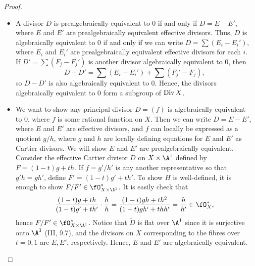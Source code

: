 \documentclass[a4paper]{article}
\begin{document}
\begin{enumerate} [label=\textbf{\arabic*.}, leftmargin=0em]
          \begin{proof} $ $ \vspace{0pt}
              \begin{itemize} [leftmargin=0cm]
                  \item[(a)] A divisor $D$ is prealgebraically equivalent to 0 if and only if $D = E - E'$, where $E$ and $E'$ are prealgebraically equivalent effective divisors.
                        Thus, $D$ is algebraically equivalent to 0 if and only if we can write $D = \sum (E_i - E_i')$, where $E_i$ and $E_i'$ are prealgebraically equivalent effective divisors for each $i$.
                        If $D' = \sum (F_j - F_j')$ is another divisor algebraically equivalent to 0, then $$D - D' = \sum (E_i - E_i') + \sum (F_j' - F_j),$$ so $D - D'$ is also algebraically equivalent to 0.
                        Hence, the divisors algebraically equivalent to 0 form a subgroup of $\operatorname{Div}{X}$.

                  \item[(b)] We want to show any principal divisor $D = (f)$ is algebraically equivalent to 0, where $f$ is some rational function on $X$.
                        Then we can write $D = E - E'$, where $E$ and $E'$ are effective divisors, and $f$ can locally be expressed as a quotient $g / h$, where $g$ and $h$ are locally defining equations for $E$ and $E'$ as Cartier divisors.
                        We will show $E$ and $E'$ are prealgebraically equivalent.
                        Consider the effective Cartier divisor $\tilde{D}$ on $X \times \A^1$ defined by $F = (1 - t)g + th$.
                        If $f = g' / h'$ is any another representative so that $g'h = gh'$, define $F' = (1 - t)g' + th'$.
                        To show $H$ is well-defined, it is enough to show $F/F' \in \fO_{X \times \A^1}^*$.
                        It is easily check that
                        \begin{equation*}
                            \frac{(1 - t)g + th}{(1 - t)g' + th'} \cdot \frac{h}{h} = \frac{(1 - t)gh + th^2}{(1 - t)gh' + thh'} = \frac{h}{h'} \in \fO_X^*,
                        \end{equation*}
                        hence $F/F' \in \fO_{X \times \A^1}^*$.
                        Notice that $\tilde{D}$ is flat over $\A^1$ since it is surjective onto $\A^1$ (III, 9.7), and the divisors on $X$ corresponding to the fibres over $t = 0, 1$ are $E, E'$, respectively.
                        Hence, $E$ and $E'$ are algebraically equivalent.


\end{itemize}
\end{proof}
\end{enumerate}
\end{document}
